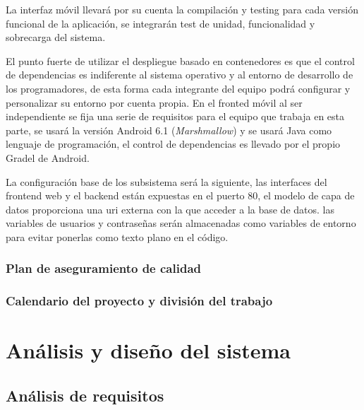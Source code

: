 \documentclass{article}
\begin{document}
La interfaz móvil llevará por su cuenta la compilación y testing para cada versión funcional de la aplicación, se integrarán test de unidad, funcionalidad y sobrecarga del sistema.

El punto fuerte de utilizar el despliegue basado en contenedores es que el control de dependencias es indiferente al sistema operativo y al entorno de desarrollo de los programadores, de esta forma cada integrante del equipo podrá configurar y personalizar su entorno por cuenta propia. En el fronted móvil al ser independiente se fija una serie de requisitos para el equipo que trabaja en esta parte, se usará la versión Android 6.1 (\textit{Marshmallow}) y se usará Java como lenguaje de programación, el control de dependencias es llevado por el propio Gradel de Android.

La configuración base de los subsistema será la siguiente, las interfaces del frontend web y el backend están expuestas en el puerto 80, el modelo de capa de datos proporciona una uri externa con la que acceder a la base de datos. las variables de usuarios y contraseñas serán almacenadas como variables de entorno para evitar ponerlas como texto plano en el código.

\subsubsection{Plan de aseguramiento de calidad}

\subsubsection{Calendario del proyecto y división del trabajo}

\pagebreak

\section{Análisis y diseño del sistema}

\subsection{Análisis de requisitos}
\end{document}
